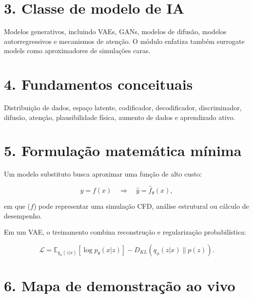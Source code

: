 \documentclass[
  brazilian,
  a4paper,
  DIV=11,
  numbers=noendperiod]{scrreprt}
\begin{document}
\section{3. Classe de modelo de IA}\label{classe-de-modelo-de-ia-1}

Modelos generativos, incluindo VAEs, GANs, modelos de difusão, modelos
autorregressivos e mecanismos de atenção. O módulo enfatiza também
surrogate models como aproximadores de simulações caras.

\section{4. Fundamentos conceituais}\label{fundamentos-conceituais-1}

Distribuição de dados, espaço latente, codificador, decodificador,
discriminador, difusão, atenção, plausibilidade física, aumento de dados
e aprendizado ativo.

\section{5. Formulação matemática
mínima}\label{formulauxe7uxe3o-matemuxe1tica-muxednima-1}

Um modelo substituto busca aproximar uma função de alto custo:

\[
y = f(x) \quad \Rightarrow \quad \hat{y} = \hat{f}_\theta(x),
\]

em que (\(f\)) pode representar uma simulação CFD, análise estrutural ou
cálculo de desempenho.

Em um VAE, o treinamento combina reconstrução e regularização
probabilística:

\[
\mathcal{L} =
\mathbb{E}_{q_\phi(z|x)}[\log p_\theta(x|z)] -
D_{KL}(q_\phi(z|x)\|p(z)).
\]

\section{6. Mapa de demonstração ao
vivo}\label{mapa-de-demonstrauxe7uxe3o-ao-vivo-1}
\end{document}
